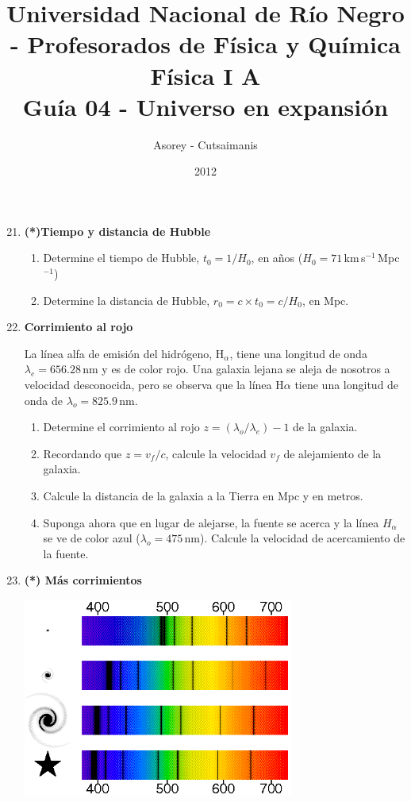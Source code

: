 \documentclass[a4paper,12pt]{article}
\begin{document}
\title{
{\normalsize{Universidad Nacional de Río Negro - Profesorados de Física y
Química}}\\ Física I A \\ Guía 04 - Universo en expansión}
\author{Asorey - Cutsaimanis}
\date{2012}
\maketitle

\begin{enumerate}
\setcounter{enumi}{20}      %

\item {\bf{(*)Tiempo y distancia de Hubble}}

\begin{enumerate}
\item Determine el tiempo de Hubble, $t_0 = 1 / H_0$, en años
($H_0=71$\,km\,s$^{-1}$\,Mpc$^{-1}$)
\item Determine la distancia de Hubble, $r_0 = c\times t_0 = c / H_0$, en Mpc.
\end{enumerate}

\item {\bf{Corrimiento al rojo}}

La línea alfa de emisión del hidrógeno, H$_\alpha$, tiene una longitud de onda
$\lambda_e = 656.28$\,nm y es de color rojo. Una galaxia lejana se aleja de
nosotros a velocidad desconocida, pero se observa que la línea H$\alpha$ tiene
una longitud de onda de $\lambda_o=825.9$\,nm.
\begin{enumerate}
\item Determine el corrimiento al rojo $z=\left ( \lambda_o/\lambda_e \right )
- 1$ de la galaxia.
\item Recordando que $z=v_f/c$, calcule la velocidad $v_f$ de alejamiento de la
galaxia.
\item Calcule la distancia de la galaxia a la Tierra en Mpc y en metros.
\item Suponga ahora que en lugar de alejarse, la fuente se acerca y la línea
$H_\alpha$ se ve de color azul ($\lambda_o=475$\,nm). Calcule la velocidad de
acercamiento de la fuente.
\end{enumerate}

\item {\bf{(*) Más corrimientos}}

\begin{center}\includegraphics[width=0.7\textwidth]{redshift.png}\end{center}


\end{enumerate}
\end{document}

